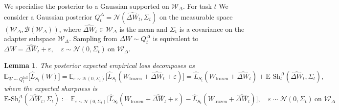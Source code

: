 \documentclass{article}
\theoremstyle{plain}
\newtheorem{lemma}[theorem]{Lemma}
\theoremstyle{definition}
\theoremstyle{remark}
\begin{document}
We specialise the posterior to a Gaussian supported on $\mathcal W_\Delta$. For task $t$ We consider a Gaussian posterior \( Q_t^{\Delta} = \mathcal{N}(\hat{\Delta W}_t, \Sigma_t) \) on the measurable space \( (\mathcal{W}_\Delta, \mathcal{B}(\mathcal{W}_\Delta)) \), where \( \hat{\Delta W}_t \in \mathcal{W}_\Delta \) is the mean and \( \Sigma_t\) is a covariance on the adapter subspace \( \mathcal{W}_\Delta \). Sampling from \( \Delta W \sim Q_t^{\Delta} \) is equivalent to 
$
\Delta W = \hat{\Delta W}_t + \varepsilon, \quad \varepsilon \sim \mathcal{N}(0, \Sigma_t) \ \text{on } \mathcal{W}_\Delta.
$ 

\begin{lemma}
    The posterior expected empirical loss decomposes as
\begin{equation*}
    \mathbb{E}_{W\sim Q_t^{\mathrm{full}}}\big[\hat{L}_{S_t}(W)\big]
= \mathbb{E}_{\varepsilon\sim\mathcal N(0,\Sigma_t)}
    \big[\hat{L}_{S_t}(W_\mathrm {frozen }+\hat{\Delta W}_t+\varepsilon)\big]
= \hat{L}_{S_t}(W_\mathrm {frozen }+\hat{\Delta W}_t)
  + \mathrm{E\text{-}Sh}_t^{\Delta}(\hat{\Delta W}_t,\Sigma_t),
\end{equation*}
where the expected sharpness is
$$
\mathrm{E\text{-}Sh}_t^{\Delta}(\hat{\Delta W}_t,\Sigma_t)
:= \mathbb{E}_{\varepsilon\sim\mathcal N(0,\Sigma_t)}
   \big[\hat{L}_{S_t}(W_\mathrm {frozen }+\hat{\Delta W}_t+\varepsilon)
       - \hat{L}_{S_t}(W_\mathrm {frozen }+\hat{\Delta W}_t)\big],\quad
\varepsilon\sim\mathcal N(0,\Sigma_t)\ \text{on } \mathcal W_\Delta$$
\end{lemma}
\end{document}
